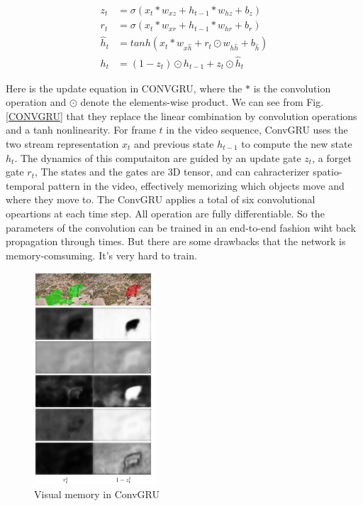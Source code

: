 \begin{align}
　　　　　z_t &= \sigma(x_t*w_{xz} + h_{t-1}*w_{hz}+b_z)　\\
　　　　　r_t &= \sigma(x_t*w_{xr} + h_{t-1}*w_{hr}+b_r) \\
　　　　　\hat{h}_t &= tanh(x_t*w_{x\hat{h}} + r_t \odot w_{h\hat{h}}+b_{\hat{h}}) \\
　　　　　h_t &= (1-z_t) \odot h_{t-1} + z_t \odot \hat{h}_t
\end{align}

Here is the update equation in CONVGRU, where the $*$ is the convolution operation and $\odot$ denote the elements-wise product.
We can see from Fig.\ref{CONVGRU} that they replace the linear combination by convolution operations and a tanh nonlinearity. For frame $t$ in the video
sequence, ConvGRU uses the two stream representation $x_t$ and previous state $h_{t-1}$ to compute the new state $h_t$. The dynamics of this computaiton 
are guided by an update gate $z_t$, a forget gate $r_t$, The states  and the gates are $3$D tensor, and can cahracterizer spatio-temporal pattern in
the video, effectively memorizing which objects move and where they move to. The ConvGRU applies a total of six convolutional opeartions at each time step.
All operation are fully differentiable. So the parameters of the convolution can be trained in an end-to-end fashion wiht back propagation through times.
But there are some drawbacks that the network is memory-comsuming. It's very hard to train. 
\begin{figure}[ht]
    \centering
    \includegraphics[width=0.4\textwidth]{figure/visual_memory.png}
    \caption{Visual memory in ConvGRU}
    \label{vis}
\end{figure}

